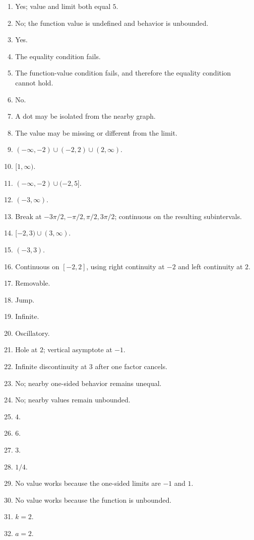 \begin{enumerate}[label=\textbf{5.\arabic*}]
  \item Yes; value and limit both equal \(5\).
  \item No; the function value is undefined and behavior is unbounded.
  \item Yes.
  \item The equality condition fails.
  \item The function-value condition fails, and therefore the equality condition cannot hold.
  \item No.
  \item A dot may be isolated from the nearby graph.
  \item The value may be missing or different from the limit.
  \item \(( -\infty,-2)\cup(-2,2)\cup(2,\infty)\).
  \item \([1,\infty)\).
  \item \(( -\infty,-2)\cup(-2,5]\).
  \item \((-3,\infty)\).
  \item Break at \(-3\pi/2,-\pi/2,\pi/2,3\pi/2\); continuous on the resulting subintervals.
  \item \([-2,3)\cup(3,\infty)\).
  \item \((-3,3)\).
  \item Continuous on \([-2,2]\), using right continuity at \(-2\) and left continuity at \(2\).
  \item Removable.
  \item Jump.
  \item Infinite.
  \item Oscillatory.
  \item Hole at \(2\); vertical asymptote at \(-1\).
  \item Infinite discontinuity at \(3\) after one factor cancels.
  \item No; nearby one-sided behavior remains unequal.
  \item No; nearby values remain unbounded.
  \item \(4\).
  \item \(6\).
  \item \(3\).
  \item \(1/4\).
  \item No value works because the one-sided limits are \(-1\) and \(1\).
  \item No value works because the function is unbounded.
  \item \(k=2\).
  \item \(a=2\).

\end{enumerate}
